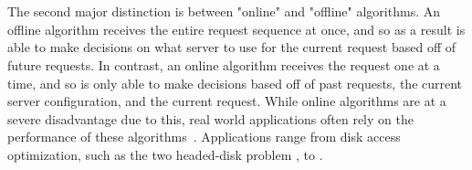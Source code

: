 \\ \\
The second major distinction is between "online" and "offline" algorithms. An offline algorithm receives the entire request sequence at once, and so as a result is able to make decisions on what server to use for the current request based off of future requests. In contrast, an online algorithm receives the request one at a time, and so is only able to make decisions based off of past requests, the current server configuration, and the current request. While online algorithms are at a severe disadvantage due to this, real world applications often rely on the performance of these algorithms~\cite{OnlineComp1998}. Applications range from disk access optimization, such as the two headed-disk problem , to .